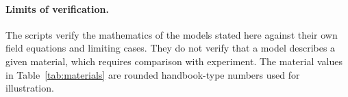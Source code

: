 \paragraph{Limits of verification.} The scripts verify the mathematics of the models stated here against their own field equations and limiting cases. They do not verify that a model describes a given material, which requires comparison with experiment. The material values in Table~\ref{tab:materials} are rounded handbook-type numbers used for illustration.
